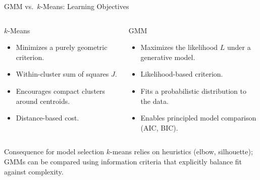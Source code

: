 \begin{frame}{GMM vs.\ $k$-Means: Learning Objectives}
  \begin{columns}[t]
      \begin{block}{$k$-Means}
        \begin{itemize}
          \item Minimizes a purely \alert{geometric criterion}.
          \item Within-cluster sum of squares $J$.
          \item Encourages compact clusters around centroids.
          \item Distance-based cost.
        \end{itemize}
      \end{block}
      \begin{block}{GMM}
        \begin{itemize}
          \item Maximizes the \alert{likelihood} $L$ under a generative model.
          \item Likelihood-based criterion.
          \item Fits a probabilistic distribution to the data.
          \item Enables principled model comparison (AIC, BIC).
        \end{itemize}
      \end{block}
  \end{columns}
  \vspace{0.6em}
  \begin{alertblock}{Consequence for model selection}
    $k$-means relies on heuristics (elbow, silhouette); GMMs can be compared using
    information criteria that explicitly balance fit against complexity.
  \end{alertblock}
\end{frame}

